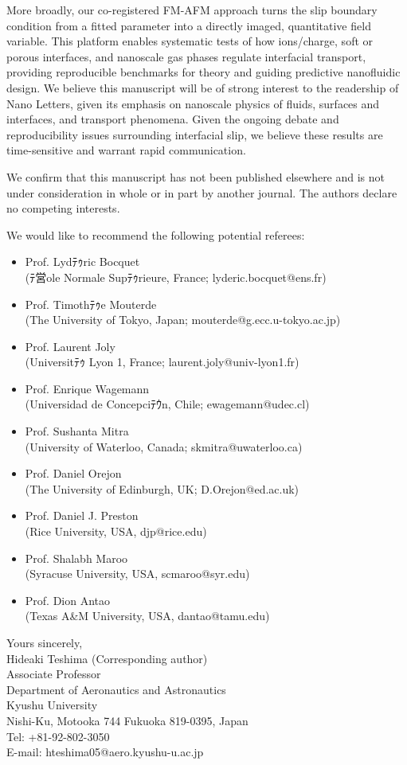 ﻿\documentclass{article}
\begin{document}
More broadly, our co-registered FM-AFM approach turns the slip boundary condition from a fitted parameter into a directly imaged, quantitative field variable. This platform enables systematic tests of how ions/charge, soft or porous interfaces, and nanoscale gas phases regulate interfacial transport, providing reproducible benchmarks for theory and guiding predictive nanofluidic design. We believe this manuscript will be of strong interest to the readership of Nano Letters, given its emphasis on nanoscale physics of fluids, surfaces and interfaces, and transport phenomena. Given the ongoing debate and reproducibility issues surrounding interfacial slip, we believe these results are time-sensitive and warrant rapid communication.

We confirm that this manuscript has not been published elsewhere and is not under consideration in whole or in part by another journal. The authors declare no competing interests.

We would like to recommend the following potential referees: 
\begin{itemize}
\item Prof. Lydﾃｩric Bocquet\\
(ﾃ営ole Normale Supﾃｩrieure, France; lyderic.bocquet@ens.fr) 
\item Prof. Timothﾃｩe Mouterde\\
(The University of Tokyo, Japan; mouterde@g.ecc.u-tokyo.ac.jp) 
\item Prof. Laurent Joly\\
(Universitﾃｩ Lyon 1, France; laurent.joly@univ-lyon1.fr)
\item Prof. Enrique Wagemann\\
(Universidad de Concepciﾃｳn, Chile; ewagemann@udec.cl)
\item Prof. Sushanta Mitra\\
(University of Waterloo, Canada; skmitra@uwaterloo.ca)
\item Prof. Daniel Orejon\\
(The University of Edinburgh, UK; D.Orejon@ed.ac.uk)
\item Prof. Daniel J. Preston\\
(Rice University, USA, djp@rice.edu)
\item Prof. Shalabh Maroo\\
(Syracuse University, USA, scmaroo@syr.edu)
\item Prof. Dion Antao\\
(Texas A\&M University, USA, dantao@tamu.edu)
\end{itemize}

Yours sincerely,\\
Hideaki Teshima (Corresponding author)\\
Associate Professor\\
Department of Aeronautics and Astronautics\\
Kyushu University\\
Nishi-Ku, Motooka 744 Fukuoka 819-0395, Japan\\
Tel: +81-92-802-3050\\
E-mail: hteshima05@aero.kyushu-u.ac.jp
\end{document}

